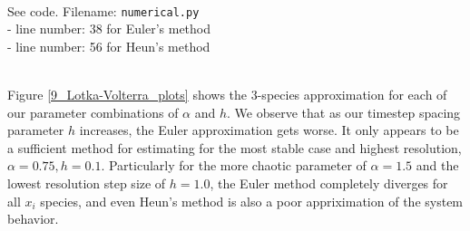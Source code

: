 \documentclass[11pt, oneside]{article}   	%
\newcommand{\prob}[2]{
\indent \\
\noindent{\color{green!50!blue}\bf {\large#1.}}
{\normalfont #2}
}
\begin{document}
\prob{1}{See code. Filename: \texttt{numerical.py} \\
	\indent - line number: 38 for Euler's method \\
	\indent -  line number: 56 for Heun's method}

\prob{2}{Figure \ref{9_Lotka-Volterra_plots} shows the 3-species approximation for each of our parameter combinations of $\alpha$ and $h$. We observe that as our timestep spacing parameter $h$ increases, the Euler approximation gets worse. It only appears to be a sufficient method for estimating for the most stable case and highest resolution, $\alpha=0.75,h=0.1$. Particularly for the more chaotic parameter of $\alpha=1.5$ and the lowest resolution step size of $h = 1.0$, the Euler method completely diverges for all $x_i$ species, and even Heun's method is also a poor appriximation of the system behavior. }
\end{document}
